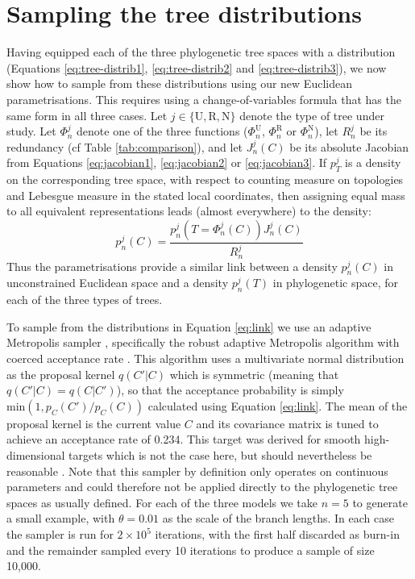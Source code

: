 \documentclass{article}
\begin{document}
\section{Sampling the tree distributions}

Having equipped each of the three phylogenetic tree spaces with a distribution 
(Equations \ref{eq:tree-distrib1}, \ref{eq:tree-distrib2} and \ref{eq:tree-distrib3}), we now show
how to sample from these distributions using our new Euclidean parametrisations.
This requires using a change-of-variables formula that has the same form in all three cases.
Let $j \in \{\mathrm{U},\mathrm{R},\mathrm{N}\}$ denote the type of tree under study.
Let $\Phi_n^j$ denote one of the three functions ($\Phi_n^\mathrm{U}$, $\Phi_n^\mathrm{R}$ or $\Phi_n^\mathrm{N}$), let $R_n^j$ be its redundancy (cf Table \ref{tab:comparison}), 
and let $J^j_n(C)$ be its absolute Jacobian from
Equations \ref{eq:jacobian1}, \ref{eq:jacobian2} or \ref{eq:jacobian3}. If $p_T^j$ is a density on the
corresponding tree space, with respect to counting measure on topologies
and Lebesgue measure in the stated local coordinates, then assigning equal mass to all equivalent representations leads (almost everywhere)
to the density:
\begin{equation}
\label{eq:link}
p_n^j(C)=\frac{p_n^j(T=\Phi_n^j(C))J^j_n(C)}{R_n^j}
\end{equation}
Thus the parametrisations provide a similar link between 
a density $p^j_n(C)$ in unconstrained Euclidean space and a density $p^j_n(T)$
in phylogenetic space, for each of the three types of trees.

To sample from the distributions in Equation \ref{eq:link} 
we use an adaptive Metropolis sampler \citep{Haario2001,Vihola2011}, 
specifically the robust adaptive Metropolis algorithm with coerced acceptance rate
\citep{Vihola2012}. 
This algorithm uses a multivariate normal distribution as the proposal kernel
$q(C'|C)$ which is symmetric (meaning that $q(C'|C)=q(C|C')$), so that the acceptance probability 
is simply $\mathrm{min}(1,p_C(C')/p_C(C))$ calculated using Equation \ref{eq:link}.
The mean of the proposal kernel is the current value $C$ and 
its covariance matrix is tuned to achieve an acceptance
rate of 0.234. This target was derived for smooth high-dimensional targets
which is not the case here, but should nevertheless be reasonable
\citep{Roberts1997,Andrieu2008}. 
Note that this sampler by definition only operates on continuous parameters and 
could therefore not be applied directly to the phylogenetic tree spaces as usually defined.
For each of the three models we take $n=5$ to generate a small example, 
with $\theta=0.01$ as the scale of the branch lengths.
In each case the sampler is run for $2\times10^{5}$ iterations, with the first half discarded
as burn-in and the remainder sampled every 10 iterations to produce a sample
of size 10,000. %
\end{document}
